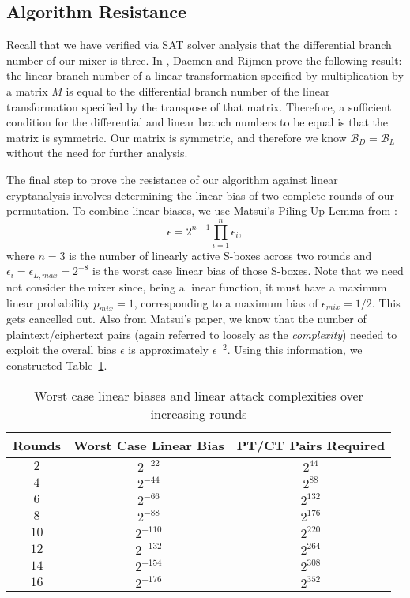\subsection{Algorithm Resistance}
Recall that we have verified via SAT solver analysis that the differential branch number of our mixer is three.
In \cite{Daemen2002_DesignOfRijndael}, Daemen and Rijmen prove the following result: the linear branch number of a linear transformation specified by multiplication by a matrix $M$ is equal to the differential branch number of the linear transformation specified by the transpose of that matrix.
Therefore, a sufficient condition for the differential and linear branch numbers to be equal is that the matrix is symmetric.
Our matrix is symmetric, and therefore we know $\mathcal{B}_D = \mathcal{B}_L$ without the need for further analysis.

The final step to prove the resistance of our algorithm against linear cryptanalysis involves determining the linear bias of two complete rounds of our permutation.
To combine linear biases, we use Matsui's Piling-Up Lemma from \cite{Matsui1993_Linear}:
\begin{equation*}
\epsilon = 2^{n-1} \prod\limits_{i = 1}^n \epsilon_i,
\end{equation*}
where $n = 3$ is the number of linearly active S-boxes across two rounds and $\epsilon_i = \epsilon_{L,max} = 2^{-8}$ is the worst case linear bias of those S-boxes.
Note that we need not consider the mixer since, being a linear function, it must have a maximum linear probability $p_{mix} = 1$, corresponding to a maximum bias of $\epsilon_{mix} = 1/2$. This gets cancelled out.
Also from Matsui's paper, we know that the number of plaintext/ciphertext pairs (again referred to loosely as the \emph{complexity}) needed to exploit the overall bias $\epsilon$ is approximately $\epsilon^{-2}$.
Using this information, we constructed Table~\ref{tab:LinearBiases}.

\begin{table}[ht]
\centering
\begin{tabular}{c|c|c}
Rounds & Worst Case Linear Bias & PT/CT Pairs Required \\
\hline
$2$  & $2^{-22}$  & $2^{44}$  \\
$4$  & $2^{-44}$  & $2^{88}$  \\
$6$  & $2^{-66}$  & $2^{132}$ \\
$8$  & $2^{-88}$  & $2^{176}$ \\
$10$ & $2^{-110}$ & $2^{220}$ \\
$12$ & $2^{-132}$ & $2^{264}$ \\
$14$ & $2^{-154}$ & $2^{308}$ \\
$16$ & $2^{-176}$ & $2^{352}$ \\
\end{tabular}
\caption{Worst case linear biases and linear attack complexities over increasing rounds}
\label{tab:LinearBiases}
\end{table}

